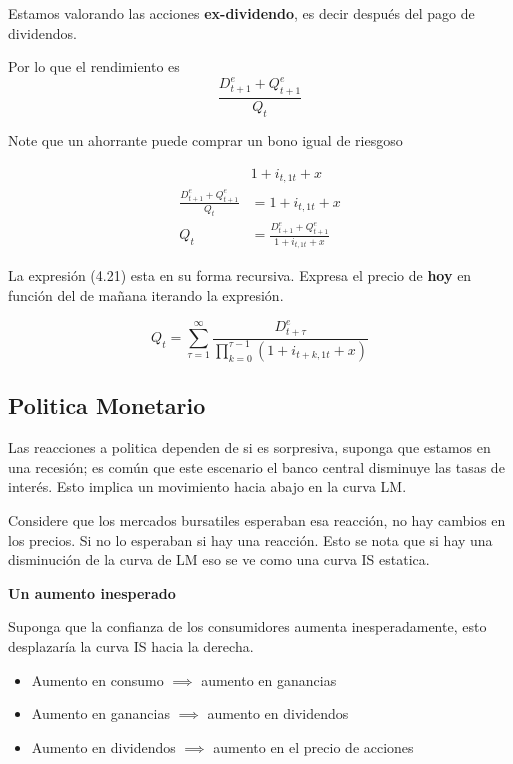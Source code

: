Estamos valorando las acciones \textbf{ex-dividendo}, es decir después del pago de dividendos. 

Por lo que el rendimiento es
\begin{equation}
    \frac{D^{e}_{t+1}+Q^{e}_{t+1}}{Q_{t}}
\end{equation}

Note que un ahorrante puede comprar un bono igual de riesgoso

\begin{align}
    &1+i_{t,1t}+x \\
    \frac{D^{e}_{t+1}+Q^{e}_{t+1}}{Q_{t}} &=1+i_{t,1t}+x \\
    Q_{t} & = \frac{D^{e}_{t+1}+Q^{e}_{t+1}}{1+i_{t,1t}+x}
\end{align}

La expresión (4.21) esta en su forma recursiva. Expresa el precio de \textbf{hoy} en función del de mañana iterando la expresión.

\begin{equation}
    Q_{t} =\sum_{\tau = 1}^{\infty}\frac{D^{e}_{t+\tau}}{\prod^{\tau-1}_{k=0}(1+i_{t+k,1t}+x)}
\end{equation}

\subsection{Politica Monetario}

Las reacciones a politica dependen de si es sorpresiva, suponga que estamos en una recesión; es común que este escenario el banco central disminuye las tasas de interés. Esto implica un movimiento hacia abajo en la curva LM.

Considere que los mercados bursatiles esperaban esa reacción, no hay cambios en los precios. Si no lo esperaban si hay una reacción. Esto se nota que si hay una disminución de la curva de LM eso se ve como una curva IS estatica. 

\textbf{Un aumento inesperado}

Suponga que la confianza de los consumidores aumenta inesperadamente, esto desplazaría la curva IS hacia la derecha.

\begin{itemize}
    \item Aumento en consumo $\implies$ aumento en ganancias
    \item Aumento en ganancias $\implies$ aumento en dividendos
    \item Aumento en dividendos $\implies$ aumento en el precio de acciones
\end{itemize}

